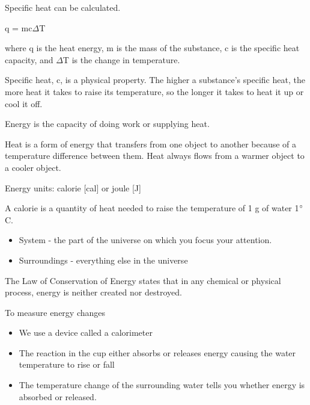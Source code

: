 \documentclass[../hchem.tex]{subfiles}
\begin{document}
Specific heat can be calculated.
\begin{center}
    q = mc$\Delta$T 
\end{center}

where q is the heat energy, m is the mass of the substance, c is the specific heat capacity, and $\Delta$T is the change in temperature.

Specific heat, c, is a physical property. The higher a substance's specific heat, the more heat it takes to raise its temperature, so the longer it takes to heat it up or cool it off.

Energy is the capacity of doing work or supplying heat.

Heat is a form of energy that transfers from one object to another because of a temperature difference between them. Heat always flows from a warmer object to a cooler object.

Energy units: calorie [cal] or joule [J]

A calorie is a quantity of heat needed to raise the temperature of 1 g of water 1$\degree$C.

\begin{itemize}
    \item System - the part of the universe on which you focus your attention.
    \item Surroundings - everything else in the universe 
\end{itemize}

The Law of Conservation of Energy states that in any chemical or physical process, energy is neither created nor destroyed.

To measure energy changes 
\begin{itemize}
    \item We use a device called a calorimeter 
    \item The reaction in the cup either absorbs or releases energy causing the water temperature to rise or fall 
    \item The temperature change of the surrounding water tells you whether energy is absorbed or released.
\end{itemize}
\end{document}
